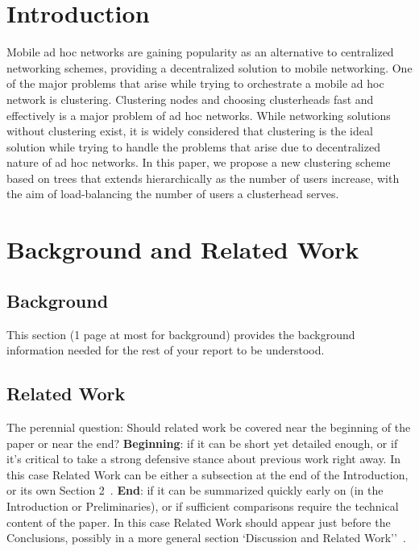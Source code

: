 \documentclass{winslabreport}
\begin{document}
\tableofcontents
\listoffigures
\listoftables
\body

\section{Introduction}

Mobile ad hoc networks are gaining popularity as an alternative to centralized
networking schemes, providing a decentralized solution to mobile networking. One
of the major problems that arise while trying to orchestrate a mobile ad hoc
network is clustering. Clustering nodes and choosing clusterheads fast and
effectively is a major problem of ad hoc networks. While networking solutions
without clustering exist, it is widely considered that clustering is the ideal
solution while trying to handle the problems that arise due to decentralized
nature of ad hoc networks. In this paper, we propose a new clustering scheme
based on trees that extends hierarchically as the number of users increase, with
the aim of load-balancing the number of users a clusterhead serves.

\section{Background and Related Work}

\subsection{Background}

This section (1 page at most for background) provides the background information needed for the rest of your report to be understood.

\subsection{Related Work}

The perennial question: Should related work be covered near the beginning of the paper or near the end?
\textbf{Beginning}: if it can be short yet detailed enough, or if it's critical to take a strong defensive stance about previous work right away. In this case Related Work can be either a subsection at the end of the Introduction, or its own Section 2~\cite{Widom2006}. \textbf{End}: if it can be summarized quickly early on (in the Introduction or Preliminaries), or if sufficient comparisons require the technical content of the paper. In this case Related Work should appear just before the Conclusions, possibly in a more general section `Discussion and Related Work''~\cite{Widom2006}.
\end{document}
